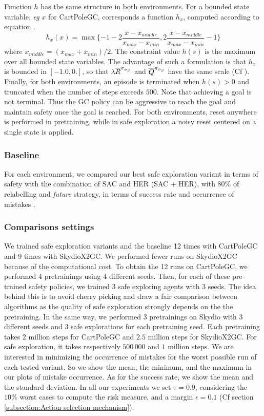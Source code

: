 Function $h$ has the same structure in both environments. For a bounded state variable, \textit{eg} $x$ for CartPoleGC,
corresponds a function $h_x$, computed according to equation . 
\begin{equation}
    h_x(x) = \max \{ -1 - 2 \frac{x - x_{middle}}{x_{max} - x_{min}}, 2 \frac{x - x_{middle}}{x_{max} - x_{min}} - 1 \}
    \label{eq:h_cartpole} 
\end{equation}
where $x_{middle} = (x_{max} + x_{min}) / 2$. The constraint value $h(s)$ is the maximum over all bounded state variables.
The advantage of such a formulation is that $h_x$ is bounded in $[-1.0, 0.]$, so that $\lambda \overline{R}^{\pi_{\phi_S}}$ and 
$\overline{Q}^{\pi_{\phi_S}}$ have the same scale (Cf ). 
Finally, for both environments, an episode is terminated when $h(s) > 0$ and truncated when the number of steps
exceeds $500$. Note that achieving a goal is not terminal. Thus the GC policy can be aggressive to
reach the goal and maintain safety once the goal is reached. For both environments, reset anywhere is performed in pretraining, while in safe exploration a noisy reset centered on a single state is applied.

\subsubsection{Baseline} 
For each environment, we compared our best safe exploration variant in terms of safety with 
the combination of SAC and HER (SAC + HER), with $80\%$ of relabelling and 
\textit{future} strategy, 
in terms of success rate and occurrence of mistakes \cite{SAC, HER}.

\subsubsection{Comparisons settings}
We trained safe exploration variants and the baseline 12 times with CartPoleGC and 9 times with SkydioX2GC. We performed fewer runs on SkydioX2GC because of the computational cost. To obtain the 12 runs on CartPoleGC, we performed 4 pretrainings using 4 different seeds. Then, for each of these pre-trained safety policies, we trained 3 safe exploring agents with 3 seeds. The idea behind this is to avoid cherry picking and draw a fair comparison between algorithms as the quality of safe exploration strongly depends on the the pretraining. In the same way, we performed 3 pretrainings on Skydio with 3 different seeds and 3 safe explorations for each pretraining seed. Each pretraining takes $2$ million steps for CartPoleGC and $2.5$ million steps for SkydioX2GC. For safe exploration, it takes respectively $500\,000$ and $1$ million steps. 
We are interested in minimizing the occurrence of mistakes 
for the worst possible run of each tested variant. So we show the mean, the minimum, and the maximum in our plots of mistake occurrence. As for the success rate, we show the mean and the standard deviation. In all our 
experiments we set $\tau = 0.9$, considering the $10\%$ worst cases to compute the risk measure, and 
a margin $\epsilon = 0.1$ (Cf section \ref{subsection:Action selection mechanism}).

